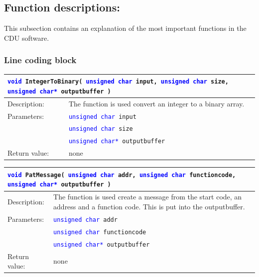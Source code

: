 \subsection{Function descriptions:}
This subsection contains an explanation of the most important functions in the CDU software.

\subsubsection{Line coding block}
\begin{table}[H]
\begin{tabular}{l p{12.5cm}}
\multicolumn{2}{p{15cm}}{\texttt{\textcolor{blue}{void} IntegerToBinary( \texttt{\textcolor{blue}{unsigned char} input, \textcolor{blue}{unsigned char} size, \textcolor{blue}{unsigned char*} outputbuffer  }) } } \\
\hline
Description:& The function is used convert an integer to a binary array.\\
Parameters:&\texttt{\textcolor{blue}{unsigned char} input}\\
&\texttt{\textcolor{blue}{unsigned char} size}\\
&\texttt{\textcolor{blue}{unsigned char*} outputbuffer}\\
Return value:&none\\
\end{tabular}
\end{table}

\begin{table}[H]
\begin{tabular}{l p{12.5cm}}
\multicolumn{2}{p{15cm}}{\texttt{\textcolor{blue}{void} PatMessage( \texttt{\textcolor{blue}{unsigned char} addr, \textcolor{blue}{unsigned char} functioncode, \textcolor{blue}{unsigned char*} outputbuffer  }) } } \\
\hline
Description:& The function is used create a message from the start code, an address and a function code. This is put into the outputbuffer.\\
Parameters:&\texttt{\textcolor{blue}{unsigned char} addr}\\
&\texttt{\textcolor{blue}{unsigned char} functioncode}\\
&\texttt{\textcolor{blue}{unsigned char*} outputbuffer}\\
Return value:&none\\
\end{tabular}
\end{table}

